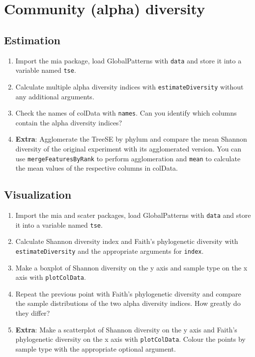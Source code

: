 \documentclass[
]{book}
\providecommand{\tightlist}{%
  \setlength{\itemsep}{0pt}\setlength{\parskip}{0pt}}
\begin{document}
\hypertarget{community-alpha-diversity}{%
\section{Community (alpha) diversity}\label{community-alpha-diversity}}

\hypertarget{estimation-1}{%
\subsection{Estimation}\label{estimation-1}}

\begin{enumerate}
\def\labelenumi{\arabic{enumi}.}
\tightlist
\item
  Import the mia package, load GlobalPatterns with \texttt{data} and store it into a
  variable named \texttt{tse}.
\item
  Calculate multiple alpha diversity indices with \texttt{estimateDiversity} without
  any additional arguments.
\item
  Check the names of colData with \texttt{names}. Can you identify which columns
  contain the alpha diversity indices?
\item
  \textbf{Extra}: Agglomerate the TreeSE by phylum and compare the mean Shannon
  diversity of the original experiment with its agglomerated version. You can
  use \texttt{mergeFeaturesByRank} to perform agglomeration and \texttt{mean} to calculate the
  mean values of the respective columns in colData.
\end{enumerate}

\hypertarget{visualization-1}{%
\subsection{Visualization}\label{visualization-1}}

\begin{enumerate}
\def\labelenumi{\arabic{enumi}.}
\tightlist
\item
  Import the mia and scater packages, load GlobalPatterns with \texttt{data} and store
  it into a variable named \texttt{tse}.
\item
  Calculate Shannon diversity index and Faith's phylogenetic diversity with
  \texttt{estimateDiversity} and the appropriate arguments for \texttt{index}.
\item
  Make a boxplot of Shannon diversity on the y axis and sample type on the x
  axis with \texttt{plotColData}.
\item
  Repeat the previous point with Faith's phylogenetic diversity and compare the
  sample distributions of the two alpha diversity indices. How greatly do they
  differ?
\item
  \textbf{Extra}: Make a scatterplot of Shannon diversity on the y axis and Faith's
  phylogenetic diversity on the x axis with \texttt{plotColData}. Colour the points
  by sample type with the appropriate optional argument.
\end{enumerate}
\end{document}
